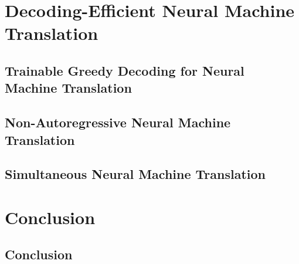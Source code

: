 \documentclass[12pt]{report}
\begin{document}
\part{Decoding-Efficient Neural Machine Translation}
\chapter[Trainable Greedy Decoding]{Trainable Greedy Decoding for Neural Machine Translation}
\label{trainable}



\chapter{Non-Autoregressive Neural Machine Translation}
\label{nat}


\chapter{Simultaneous Neural Machine Translation}
\label{simul}



\part{Conclusion}
\chapter{Conclusion}
\label{conclusion}








\cleardoublepage %
\end{document}
